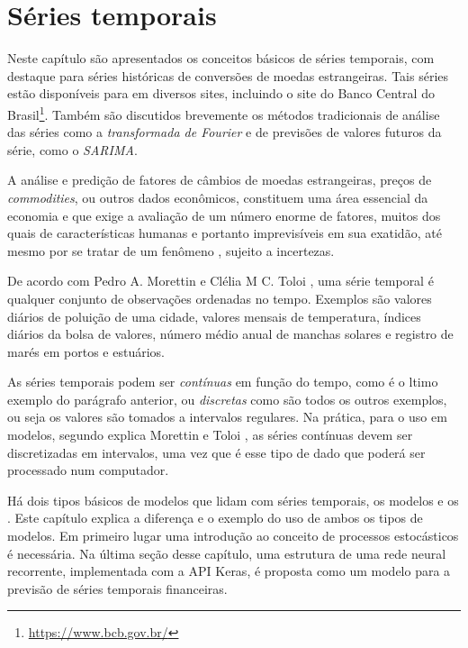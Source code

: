 

\chapter{Séries temporais}
\label{cap:series}

Neste capítulo são apresentados os conceitos básicos de séries temporais, com destaque para séries históricas de conversões de moedas estrangeiras. Tais séries estão disponíveis para  em diversos sites, incluindo o site do Banco Central do Brasil\footnote{\url{https://www.bcb.gov.br/}}. Também são discutidos brevemente os métodos tradicionais de análise das séries como a \emph{transformada de Fourier} e de previsões de valores futuros da série, como o \emph{SARIMA}.

A análise e predição de fatores de câmbios de moedas estrangeiras, preços de \emph{commodities}, ou outros dados econômicos, constituem uma área essencial da economia e que exige a avaliação de um número enorme de fatores, muitos dos quais de características humanas e portanto imprevisíveis em sua exatidão, até mesmo por se tratar de um fenômeno , sujeito a incertezas.

De acordo com Pedro A. Morettin e Clélia M C. Toloi \citep{morettin}, uma série temporal é qualquer conjunto de observações ordenadas no tempo. Exemplos são valores diários de poluição de uma cidade, valores mensais de temperatura, índices diários da bolsa de valores, número médio anual de manchas solares e registro de marés em portos e estuários.

As séries temporais podem ser \emph{contínuas} em função do tempo, como é o ltimo exemplo do parágrafo anterior, ou \emph{discretas} como são todos os outros exemplos, ou seja os valores são tomados a intervalos regulares. Na prática, para o uso em modelos, segundo explica Morettin e Toloi \citep{morettin}, as séries contínuas devem ser discretizadas em intervalos, uma vez que é esse tipo de dado que poderá ser processado num computador.

Há dois tipos básicos de modelos que lidam com séries temporais, os modelos  e os . Este capítulo explica a diferença e o exemplo do uso de ambos os tipos de modelos. Em primeiro lugar uma introdução ao conceito de processos estocásticos é necessária. Na última seção desse capítulo, uma estrutura de uma rede neural recorrente, implementada com a API Keras, é proposta como um modelo  para a previsão de séries temporais financeiras.

